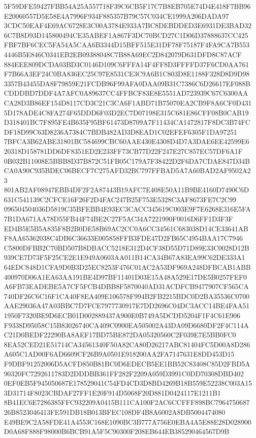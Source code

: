 \documentclass[UTF8,fontset=fandol,zihao=-4,a4paper]{ctexart}
\begin{document}
{{5F59DFE59427FBB54A25A557718F39C6CB5F17C7B8EB705E74D4E418F7BB96E20060557D5E58E4A7996F934F885357B79C57C034CE1999A206DADA97
3CDC50EAF4E69AC6728E3C00A3784E933A7BC8DEBDDED3E6931DE3BAD326C7B8D93D145800494CE35ABEF1A867F3DC70BCD27C1D06D37888637CC425
FBF7BF6CEC5FA54A5CAA6B3344D15BFF515E31DF78F75187F4FA9CA7B5534446B5E846C0341EB2EB09388048C7B88A69EC2D842079D631DFD8C87ACF
884EEE809DCDA03BD3C0146D109C6FFFA14F4FF8D3FFFFD37F6CD0AA761F7B66A3EF24C0BA836EC25C97E8531CE3C9A6B1C803D8E1188F328D8D9D98
3357B43455DA8F79859E21FCDB96F99AFA0DAA09B31C7386C6D26617EF088BCDDDBD7DDF4A7AFC0A89637CC4FFBCF83E8E5551AD723939C67C6300AA
CA28D3B86EF154D8117CD3C21C3CA6F1ABD71B75070EA2CB9F8A6CF0D4315D178ADE4C8FA274F65DDD6F03D2EC7D07198E315C681E86CFF08B0CAB19
D318401BC7F895FE4B635F95BF61473D8709A7F11434CA1472817F8DC3B74FCDF18D99C63D8236A7384C7BDB482AD3D8EAD1C02EFEF6305F1DA97251
7BFCA3B62ABE31801BC584699CBC60AAE430E4308D4D7A3DAE6EE42599E620318D158781DD6DF8351ED2E233FF73CB77D22F247E27C857EC57DF6A1F
0B032B11008E5BBB8D37B872C51FB05C179A7F38422D2F6DA7CDAE847D34BCA0A90C935BDEC06BECF7C275AFD32BC797FFBAD5A7A60BAD2AF9502A23
801AB2AF08947EBB4DF2F2A87443B19AFC7E408E50A11B9BE4160D7490C6D631C541139C2CFCE16F26F2D4FAC247B25F753E5328C3AF8673FE7C2C99
096504504036D5819C35BFEBB4E93EC3CACC345619C003E9F7E6268E316E5FA7B1DA671AA78D55FB44F74BE2C27F5AC34A7221990F0016D6FF1D3F3F
ED4B5E5B5A835F8B2B0DE58B69AC2CC0A6CC34561C683038D14CE33641ABF8AA65362038C4DB6C36633E005858FFB3FDE47D2FB65C4954BAA17C7946
C5800DFBB2C70BD507B8DBACC5218E312D4CF38D55D71D89E33C0028D12B939CE7D73F5F25CE2E1E949A0603AA011B14CA34B67A83EA99C62DE333A1
64EDC848D1CFA9D0B3D25EC8253F476C01AC2A53DF969A248DFBCAB1ABB400970D06A1EA63AA191BE4D97BF11401D03E15A48A529E17DE5B0257FEF0
A6FB73EADEBE5A7CF5FCB4DBB8F5870040AD31ACDFCB9477907CF565CA740DF26C6C16F1CA40F8EA409E106578F994B2FB2215BDC0D2BA35536C0700
AAE29036A47A03BBC7D7FCE7977730917E7DD2696C04DC3ACC14BE4FAA511950F7320BE9D6ECB01D002889437A900E0B749A5DCDD5204F1F4C61E906
F9338D95058C15B83026740CA409C0900EA505002A43DA09D6680DF2F4C114AC21D0BEDF22290BA8AEF17BD75BE872DA05320560C2F039E7E5BB0FC0
8EA52CED21E51714CA34561340F50A82CA80D26217ABC81404FC5D00A8D286A605C1AD00F6AD6609CF26B9A0501E918200AA2FA7147631E8DD453D15
F9DBF91252006D5ACFD850B81BC0D6EDECB5EE1BB52C83408C85D2FBD5A90320FC7292611783D2DDDBB361FF282F2209A059D3991C0DD70308DBD402
0EF0EB5F945050687E178529041C54FD4CD3D8BD4269B18B559E52238C003A153D31714F8023CBDAF27FF1E20F914D5068F20D881D0424117E1211B1
8B41EC6E7286385FFC932209A0415B111CA100F2AC6CCFFF898BC796475068726B8523046413FE591DB18B013BFEC108DF4B8A6002A8DB5004474080
E49BE9C2A58FDE41A4553C168E1090BC3B777A756E0EBA4A5E88E28D028900D0A68F888F98000B6BCB91A5F5C90300F208EB644EB385290464567D9B
}}
\end{document}
